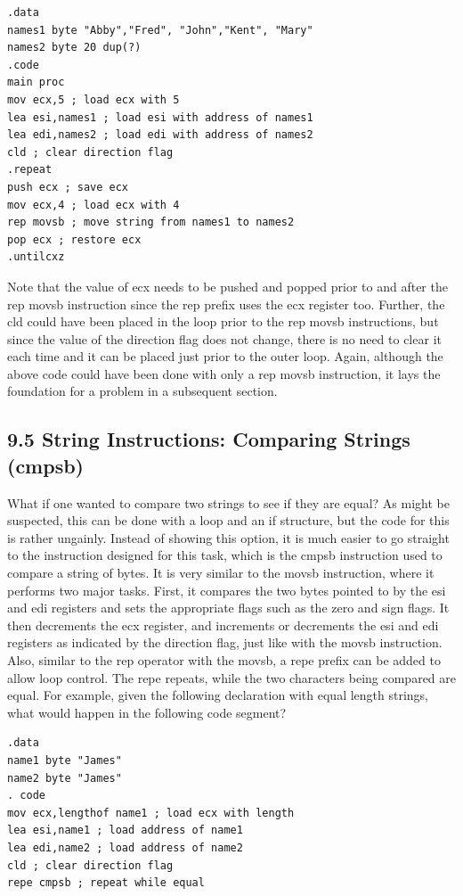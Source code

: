 \documentclass[10pt]{book}
\begin{document}
\begin{center}
\begin{center}
\begin{center}
\begin{center}
\begin{verbatim}
.data
names1 byte "Abby","Fred", "John","Kent", "Mary"
names2 byte 20 dup(?)
.code
main proc
mov ecx,5 ; load ecx with 5
lea esi,names1 ; load esi with address of names1
lea edi,names2 ; load edi with address of names2
cld ; clear direction flag
.repeat
push ecx ; save ecx
mov ecx,4 ; load ecx with 4
rep movsb ; move string from names1 to names2
pop ecx ; restore ecx
.untilcxz
\end{verbatim}

Note that the value of ecx needs to be pushed and popped prior to and after the rep movsb instruction since the rep prefix uses the ecx register too. Further, the cld could have been placed in the loop prior to the rep movsb instructions, but since the value of the direction flag does not change, there is no need to clear it each time and it can be placed just prior to the outer loop. Again, although the above code could have been done with only a rep movsb instruction, it lays the foundation for a problem in a subsequent section.

\subsection*{9.5 String Instructions: Comparing Strings (cmpsb)}
What if one wanted to compare two strings to see if they are equal? As might be suspected, this can be done with a loop and an if structure, but the code for this is rather ungainly. Instead of showing this option, it is much easier to go straight to the instruction designed for this task, which is the cmpsb instruction used to compare a string of bytes. It is very similar to the movsb instruction, where it performs two major tasks. First, it compares the two bytes pointed to by the esi and edi registers and sets the appropriate flags such as the zero and sign flags. It then decrements the ecx register, and increments or decrements the esi and edi registers as indicated by the direction flag, just like with the movsb instruction. Also, similar to the rep operator with the movsb, a repe prefix can be added to allow loop control. The repe repeats, while the two characters being compared are equal. For example, given the following declaration with equal length strings, what would happen in the following code segment?

\begin{verbatim}
.data
name1 byte "James"
name2 byte "James"
. code
mov ecx,lengthof name1 ; load ecx with length
lea esi,name1 ; load address of name1
lea edi,name2 ; load address of name2
cld ; clear direction flag
repe cmpsb ; repeat while equal
\end{verbatim}


\end{center}
\end{center}
\end{center}
\end{center}
\end{document}
